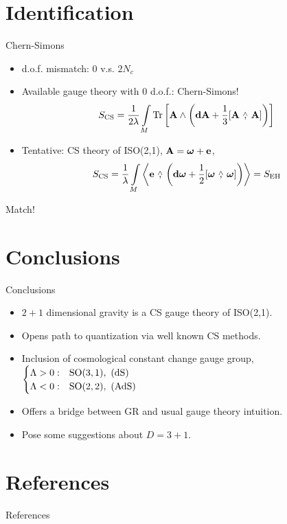 \documentclass{beamer}
\newcommand{\wedgecomma}{\stackon[1pt]{,}{\smash{\scriptsize$\wedge$}}}
\newcommand{\wedgecomm}[2]{\qty[ #1\ \wedgecomma\ #2 ]}
\begin{document}
\section{Identification}

\begin{frame}{Chern-Simons}
    \begin{itemize}
        \item d.o.f. mismatch: $0$ v.s. $2N_c$\pause
        \item Available gauge theory with $0$ d.o.f.: Chern-Simons!
        $$S_{\textnormal{CS}}=\frac{1}{2\lambda}\int\limits_M\Tr\qty[\vb A \wedge \qty(\vb d{\vb A}+\frac13\wedgecomm{\vb A}{\vb A})]$$\pause
        \item Tentative: CS theory of ISO(2,1), $\vb A =\boldsymbol\omega+\vb e$,\pause
        $$S_{\textnormal{CS}}=\frac1\lambda\int\limits_M\expval{\vb e\ \wedgecomma\ \qty(\vb d{\boldsymbol\omega}+\frac12\wedgecomm{\boldsymbol\omega}{\boldsymbol\omega})}=S_{\textnormal{EH}}$$
    \end{itemize}
    Match!
\end{frame}

\section{Conclusions}

\begin{frame}{Conclusions}
    \begin{itemize}
        \item $2+1$ dimensional gravity is a CS gauge theory of ISO(2,1).\pause
        \item Opens path to quantization via well known CS methods.\pause
        \item Inclusion of cosmological constant change gauge group, $\begin{cases}\Lambda > 0: & \textnormal{SO}\qty(3,1),\ (\textnormal{dS})\\\Lambda < 0: & \textnormal{SO}\qty(2,2), \ (\textnormal{AdS})\end{cases}$\pause
        \item Offers a bridge between GR and usual gauge theory intuition.\pause
        \item Pose some suggestions about $D=3+1$.
    \end{itemize}
\end{frame}

\begin{frame}
\end{frame}

\section{References}

\begin{frame}{References}
    \printbibliography
\end{frame}

\addtocounter{framenumber}{2000}
\end{document}
